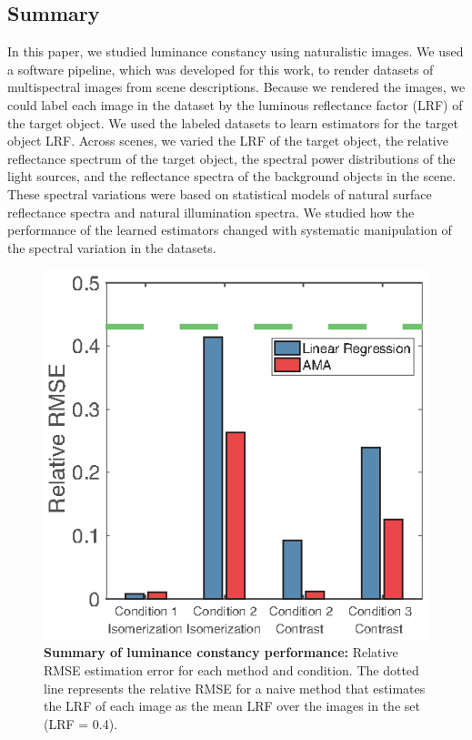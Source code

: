 \documentclass{jov}
\begin{document}
\subsection{Summary}
In this paper, we studied luminance constancy using naturalistic images.
We used a software pipeline, which was developed for this work, to render datasets of multispectral images from scene descriptions.
Because we rendered the images, we could label each image in the dataset by the luminous reflectance factor (LRF) of the target object.
We used the labeled datasets to learn estimators for the target object LRF.
Across scenes, we varied the LRF of the target object, the relative reflectance spectrum of the target object, 
the spectral power distributions of the light sources, and the reflectance spectra of the background objects in the scene.
These spectral variations were based on statistical models of natural surface reflectance spectra and natural illumination spectra.
We studied how the performance of the learned estimators changed with systematic manipulation of the spectral variation in the datasets.

\begin{figure}
\centering
\includegraphics{Figure14.eps}
\caption{{\bf Summary of luminance constancy performance:} Relative RMSE estimation error for each method and condition. The dotted line represents the relative RMSE for a naive method that estimates the LRF of each image as the mean LRF over the images in the set (LRF = 0.4).}
 \label{fig:barGraphs}
\end{figure}
\end{document}
